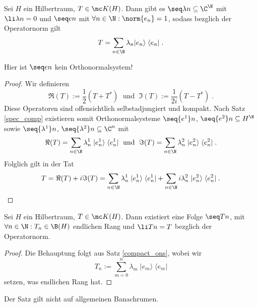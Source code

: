 \begin{theorem}
	\label{compact_ons}
	Sei $H$ ein Hilbertraum, \(T\in\mc K(H)\). Dann gibt es \(\seq \lambda n \subseteq \C^\N\) mit \(\li \lambda n = 0\) und \(\seq en\) mit \(\forall n \in\N: \norm{e_n} = 1\), sodass bez\us glich der Operatornorm gilt
	\[T = \sum_{n\in\N} \lambda_n \vert e_n\rangle \;\langle e_n\vert\;.\]
\end{theorem}
\begin{rem}
	Hier ist \(\seq en\) kein Orthonormalsystem!
\end{rem}
\begin{proof} 
	Wir definieren 
	\[\Re(T) := \frac{1}{2}(T + T^*)\;\text{ und } \; \Im(T) := \frac{1}{2i} (T-T^*)\;.\]
	Diese Operatoren sind offensichtlich selbstadjungiert und kompakt. Nach Satz \ref{spec_comp} existieren somit Orthonormalsysteme \(\seq{e^1} n\), \(\seq{e^2}n\subseteq H^\N\) sowie \(\seq{\lambda^1}n\), \(\seq{\lambda^2}n \subseteq \C^n\) mit 
	\[\Re(T) = \sum_{n\in\N} \lambda^1_n \;\vert e^1_n\rangle \;\langle e^1_n\vert\;\text{ und }\; \Im(T) = \sum_{n\in\N} \lambda^2_n \;\vert e^2_n\rangle \;\langle e^2_n\vert\;.\]
	Folglich gilt in der Tat
	\[T = \Re(T) + i  \Im(T) = \sum_{n\in\N} \lambda^1_n \;\vert e^1_n\rangle \;\langle e^1_n\vert + \sum_{n\in\N} i\lambda^2_n \;\vert e^2_n\rangle \;\langle e^2_n\vert\;.\]
\end{proof}

\begin{theorem}
	Sei $H$ ein Hilbertraum, \(T\in \mc K(H)\). Dann existiert eine Folge \(\seq Tn\), mit \(\forall n\in\N: T_n \in \B(H)\) endlichen Rang und \(\li Tn = T\) bez\us glich der Operatornorm.
\end{theorem}
\begin{proof}
	Die Behauptung folgt aus Satz \ref{compact_ons}, wobei wir
	\[T_n := \sum_{m=0}^n \lambda_m \;\vert e_m\rangle \;\langle e_m \vert\]
	setzen, was endlichen Rang hat.
	\end{proof}
	\begin{rem}
		Der Satz gilt nicht auf allgemeinen Banachr\as umen.
	\end{rem}


